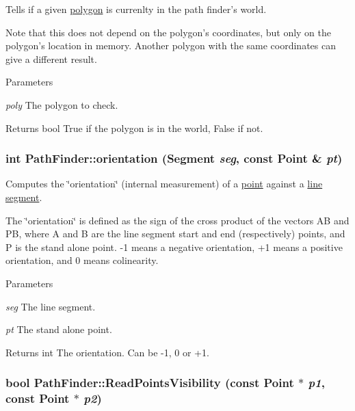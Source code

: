 Tells if a given \hyperlink{structPathFinder_1_1ConvexPolygon}{polygon} is currenlty in the path finder's world. 

Note that this does not depend on the polygon's coordinates, but only on the polygon's location in memory. Another polygon with the same coordinates can give a different result.


\begin{DoxyParams}{Parameters}
\item[{\em poly}]The polygon to check. \end{DoxyParams}
\begin{DoxyReturn}{Returns}
bool True if the polygon is in the world, False if not. 
\end{DoxyReturn}
\hypertarget{classPathFinder_a00ffa1d61e4ecdb8238d462c584f4007}{
\subsubsection[{orientation}]{\setlength{\rightskip}{0pt plus 5cm}int PathFinder::orientation ({\bf Segment} {\em seg}, \/  const {\bf Point} \& {\em pt})}}
\label{classPathFinder_a00ffa1d61e4ecdb8238d462c584f4007}


Computes the \char`\"{}orientation\char`\"{} (internal measurement) of a \hyperlink{structPathFinder_1_1Point}{point} against a \hyperlink{structPathFinder_1_1Segment}{line segment}. 

The \char`\"{}orientation\char`\"{} is defined as the sign of the cross product of the vectors AB and PB, where A and B are the line segment start and end (respectively) points, and P is the stand alone point. -\/1 means a negative orientation, +1 means a positive orientation, and 0 means colinearity.


\begin{DoxyParams}{Parameters}
\item[{\em seg}]The line segment. \item[{\em pt}]The stand alone point. \end{DoxyParams}
\begin{DoxyReturn}{Returns}
int The orientation. Can be -\/1, 0 or +1. 
\end{DoxyReturn}
\hypertarget{classPathFinder_ab8c06520b832da1cda6f781177af982b}{
\subsubsection[{ReadPointsVisibility}]{\setlength{\rightskip}{0pt plus 5cm}bool PathFinder::ReadPointsVisibility (const {\bf Point} $\ast$ {\em p1}, \/  const {\bf Point} $\ast$ {\em p2})}}
\label{classPathFinder_ab8c06520b832da1cda6f781177af982b}


